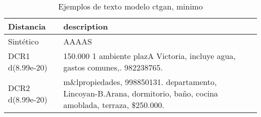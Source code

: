 \begin{table}[H]
\centering
\fontsize{10}{14}\selectfont
\caption{Ejemplos de texto modelo ctgan, minimo}
\label{table-example-economicos-b-2-ctgan-min-text}
\begin{tabular}{|l|m{35em}|}
\hline
\rowcolor[gray]{0.8}
Distancia & description \\
\hline Sintético & AAAAS \\
\hline DCR1 d(8.99e-20) & 150.000 1 ambiente plazA Victoria, incluye agua, gastos comunes,. 982238765. \\
\hline DCR2 d(8.99e-20) & m\&lpropiedades, 998850131. departamento, Lincoyan-B.Arana, dormitorio, ba\~no, cocina amoblada, terraza, \$250.000. \\
\hline
\end{tabular}
\end{table}
